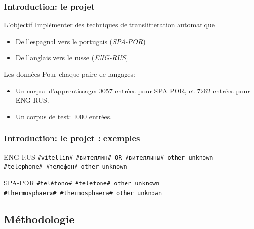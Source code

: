 \documentclass{beamer}
\begin{document}
\begin{frame}
\frametitle{Introduction: le projet}

	\begin{block}{L'objectif}
		Implémenter des techniques de translittération automatique
		\begin{itemize}
            \item De l'espagnol vers le portugais (\emph{SPA-POR})
            \item De l'anglais vers le russe (\emph{ENG-RUS})
		\end{itemize}
	\end{block}

	\begin{block}{Les données}
	Pour chaque paire de langages:		
		\begin{itemize}
            \item Un corpus d'apprentissage: 3057 entrées pour SPA-POR, et 7262 entrées pour ENG-RUS.
		\item Un corpus de test: 1000 entrées.
		\end{itemize}		
	\end{block}

\end{frame}

\begin{frame}[fragile]
\frametitle{Introduction: le projet : exemples}
\begin{block}{ENG-RUS}
\foreignlanguage{russian}{
\texttt{\#vitellin\# \#вителлин\# OR \#вителлины\#	other unknown}\\
\texttt{\#telephone\# \#телефон\# other unknown} }
\end{block}
\begin{block}{SPA-POR}
\texttt{\#teléfono\# \#telefone\#	other	unknown}\\
\texttt{\#thermosphaera\# \#thermosphaera\#	other	unknown}
\end{block}
\end{frame}


\subsection{Méthodologie}
\end{document}
